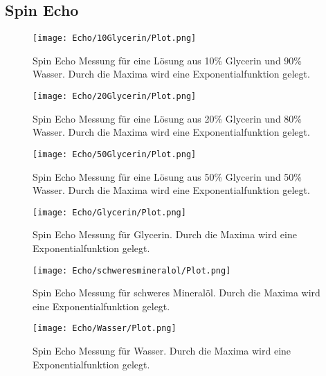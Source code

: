 \documentclass[10pt,twoside]{article}
\renewcommand{\1}{^{-1}}
\renewcommand{\2}{^{-2}}
\newcommand{\3}{^{-3}}
\newcommand{\4}{^{-4}}
\newcommand{\5}{^{-5}}
\newcommand{\6}{^{-6}}
\newcommand{\7}{^{-7}}
\newcommand{\8}{^{-8}}
\newcommand{\9}{^{-9}}
\begin{document}
\subsection{Spin Echo}
\begin{figure}[H]
\centering
\texttt{[image: Echo/10Glycerin/Plot.png]} 
\caption{Spin Echo Messung für eine Lösung aus 10\% Glycerin und 90\% Wasser. Durch die Maxima wird eine Exponentialfunktion gelegt.}
\end{figure}
\begin{figure}[H]
\centering
\texttt{[image: Echo/20Glycerin/Plot.png]} 
\caption{Spin Echo Messung für eine Lösung aus 20\% Glycerin und 80\% Wasser. Durch die Maxima wird eine Exponentialfunktion gelegt.}
\end{figure}
\begin{figure}[H]
\centering
\texttt{[image: Echo/50Glycerin/Plot.png]} 
\caption{Spin Echo Messung für eine Lösung aus 50\% Glycerin und 50\% Wasser. Durch die Maxima wird eine Exponentialfunktion gelegt.}
\end{figure}
\begin{figure}[H]
\centering
\texttt{[image: Echo/Glycerin/Plot.png]} 
\caption{Spin Echo Messung für Glycerin. Durch die Maxima wird eine Exponentialfunktion gelegt.}
\end{figure}
\begin{figure}[H]
\centering
\texttt{[image: Echo/schweresmineralol/Plot.png]} 
\caption{Spin Echo Messung für schweres Mineralöl. Durch die Maxima wird eine Exponentialfunktion gelegt.}
\end{figure}
\begin{figure}[H]
\centering
\texttt{[image: Echo/Wasser/Plot.png]} 
\caption{Spin Echo Messung für Wasser. Durch die Maxima wird eine Exponentialfunktion gelegt.}
\end{figure}
\end{document}
